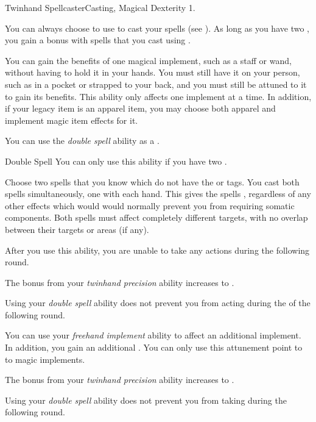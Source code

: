    \begin{feat}{Twinhand Spellcaster}{Casting, Magical}
        \featpre Dexterity 1.

         You can always choose to use  to cast your spells (see ).
        As long as you have two , you gain a   bonus with spells that you cast using .

         You can gain the benefits of one magical implement, such as a staff or wand, without having to hold it in your hands.
        You must still have it on your person, such as in a pocket or strapped to your back, and you must still be attuned to it to gain its benefits.
        This ability only affects one implement at a time.
        In addition, if your legacy item is an apparel item, you may choose both apparel and implement magic item effects for it.

         You can use the \textit{double spell} ability as a .
        \begin{instantability}{Double Spell}
            You can only use this ability if you have two .

            Choose two spells that you know which do not have the  or  tags.
            You cast both spells simultaneously, one with each hand.
            This gives the spells , regardless of any other effects which would would normally prevent you from requiring somatic components.
            Both spells must affect completely different targets, with no overlap between their targets or areas (if any).

            After you use this ability, you are unable to take any actions during the following round.
        \end{instantability}

         The bonus from your \textit{twinhand precision} ability increases to .

         Using your \textit{double spell} ability does not prevent you from acting during the  of the following round.

         You can use your \textit{freehand implement} ability to affect an additional implement.
        In addition, you gain an additional .
        You can only use this attunement point to  to magic implements.

         The bonus from your \textit{twinhand precision} ability increases to .

         Using your \textit{double spell} ability does not prevent you from taking  during the following round.
    \end{feat}

